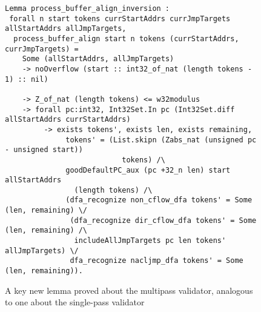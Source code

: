 \documentclass[conference]{IEEEtran}
\begin{document}
\begin{figure*}
\begin{verbatim}
Lemma process_buffer_align_inversion :
 forall n start tokens currStartAddrs currJmpTargets allStartAddrs allJmpTargets,
  process_buffer_align start n tokens (currStartAddrs, currJmpTargets) =
    Some (allStartAddrs, allJmpTargets)
    -> noOverflow (start :: int32_of_nat (length tokens - 1) :: nil)

    -> Z_of_nat (length tokens) <= w32modulus
    -> forall pc:int32, Int32Set.In pc (Int32Set.diff allStartAddrs currStartAddrs)
         -> exists tokens', exists len, exists remaining,
              tokens' = (List.skipn (Zabs_nat (unsigned pc - unsigned start))
                           tokens) /\
              goodDefaultPC_aux (pc +32_n len) start allStartAddrs
                (length tokens) /\
              (dfa_recognize non_cflow_dfa tokens' = Some (len, remaining) \/
               (dfa_recognize dir_cflow_dfa tokens' = Some (len, remaining) /\
                includeAllJmpTargets pc len tokens' allJmpTargets) \/
               dfa_recognize nacljmp_dfa tokens' = Some (len, remaining)).
\end{verbatim}
  \caption{A key new lemma proved about the multipass validator,
    analogous to one about the single-pass validator}
\label{fig:coq-lemma}
\end{figure*}



\end{document}
